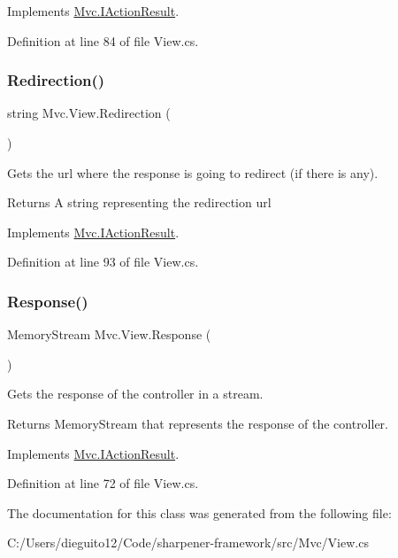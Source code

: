 Implements \hyperlink{interface_mvc_1_1_i_action_result_a8ad08f29bba90dfbe06d7a00465af10a}{Mvc.\+I\+Action\+Result}.



Definition at line 84 of file View.\+cs.

\mbox{\label{class_mvc_1_1_view_a6628a16ae93e0269d91413a3a38d0132}} 
\subsubsection{\texorpdfstring{Redirection()}{Redirection()}}
{\footnotesize\ttfamily string Mvc.\+View.\+Redirection (\begin{DoxyParamCaption}{ }\end{DoxyParamCaption})}



Gets the url where the response is going to redirect (if there is any). 

\begin{DoxyReturn}{Returns}
A string representing the redirection url
\end{DoxyReturn}


Implements \hyperlink{interface_mvc_1_1_i_action_result_a036707da116ea300eae90e105b8d1ced}{Mvc.\+I\+Action\+Result}.



Definition at line 93 of file View.\+cs.

\mbox{\label{class_mvc_1_1_view_a8a5a1a1990be0c3704b4f3262c503a2a}} 
\subsubsection{\texorpdfstring{Response()}{Response()}}
{\footnotesize\ttfamily Memory\+Stream Mvc.\+View.\+Response (\begin{DoxyParamCaption}{ }\end{DoxyParamCaption})}



Gets the response of the controller in a stream. 

\begin{DoxyReturn}{Returns}
Memory\+Stream that represents the response of the controller.
\end{DoxyReturn}


Implements \hyperlink{interface_mvc_1_1_i_action_result_a7cf7423071384c7b2bac75a5f4d6e25c}{Mvc.\+I\+Action\+Result}.



Definition at line 72 of file View.\+cs.



The documentation for this class was generated from the following file\+:\begin{DoxyCompactItemize}
\item 
C\+:/\+Users/dieguito12/\+Code/sharpener-\/framework/src/\+Mvc/View.\+cs\end{DoxyCompactItemize}

